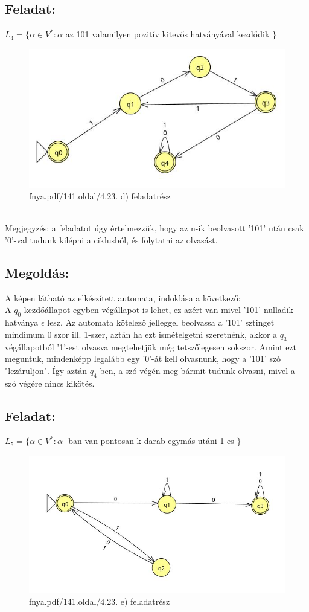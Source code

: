 \documentclass[12pt]{article}
\begin{document}
\subsection{Feladat:}
$ L_4 = \{ \alpha \in V^* : \alpha $ az 101 valamilyen pozitív kitevős hatványával kezdődik $\}$
\begin{figure}[h]
  \centering
  \includegraphics[width=0.7\linewidth]{img/d.jpg} 
  \caption{fnya.pdf/141.oldal/4.23. d) feladatrész}
  \label{fig:your_label}
\end{figure}
\\ Megjegyzés: a feladatot úgy értelmezzük, hogy az n-ik beolvasott '101' után csak '0'-val tudunk kilépni
a ciklusból, és folytatni az olvasást.
\subsection{Megoldás:}
A képen látható az elkészített automata, indoklása a következő: \\
A $q_0$ kezdőállapot egyben végállapot is lehet, ez azért van mivel '101' nulladik hatványa $\epsilon$ lesz.
Az automata kötelező jelleggel beolvassa a '101' sztinget mindimum 0 szor ill. 1-szer, aztán ha ezt ismételgetni
szeretnénk, akkor a $q_3$ végállapotból '1'-est olvasva megtehetjük még tetszőlegesen sokszor. Amint ezt meguntuk,
mindenképp legalább egy '0'-át kell olvasnunk, hogy a '101' szó "lezáruljon". Így aztán $q_4$-ben, a szó végén
meg bármit tudunk olvasni, mivel a szó végére nincs kikötés.
\subsection{Feladat:}
$ L_5 = \{ \alpha \in V^* : \alpha $ -ban van pontosan k darab egymás utáni 1-es $\}$
\begin{figure}[h]
  \centering
  \includegraphics[width=0.7\linewidth]{img/e.jpg} 
  \caption{fnya.pdf/141.oldal/4.23. e) feladatrész}
  \label{fig:your_label}
\end{figure}
\end{document}
